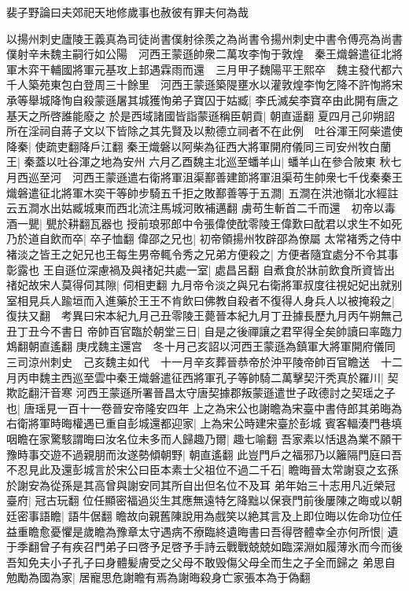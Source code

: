 裴子野論曰夫郊祀天地修歲事也赦彼有罪夫何為哉

以揚州刺史廬陵王義真為司徒尚書僕射徐羨之為尚書令揚州刺史中書令傅亮為尚書僕射辛未魏主嗣行如公陽　河西王蒙遜帥衆二萬攻李恂于敦煌　秦王熾磐遣征北將軍木弈干輔國將軍元基攻上邽遇霖雨而還　三月甲子魏陽平王熙卒　魏主發代都六千人築苑東包白登周三十餘里　河西王蒙遜築隄壅水以灌敦煌李恂乞降不許恂將宋承等舉城降恂自殺蒙遜屠其城獲恂弟子寶囚于姑臧|{
	李氏滅矣李寶卒由此開有唐之基天之所啓誰能廢之}
於是西域諸國皆詣蒙遜稱臣朝貢|{
	朝直遥翻}
夏四月己卯朔詔所在淫祠自蔣子文以下皆除之其先賢及以勲德立祠者不在此例　吐谷渾王阿柴遣使降秦|{
	使疏吏翻降戶江翻}
秦王熾磐以阿柴為征西大將軍開府儀同三司安州牧白蘭王|{
	秦蓋以吐谷渾之地為安州}
六月乙酉魏主北巡至蟠羊山|{
	蟠羊山在參合陂東}
秋七月西巡至河　河西王蒙遜遣右衛將軍沮渠鄯善建節將軍沮渠苟生帥衆七千伐秦秦王熾磐遣征北將軍木奕干等帥步騎五千拒之敗鄯善等于五澗|{
	五澗在洪池嶺北水經註云五澗水出姑臧城東而西北流注馬城河敗補邁翻}
虜苟生斬首二千而還　初帝以毒酒一甖|{
	甖於耕翻瓦器也}
授前琅邪郎中令張偉使酖零陵王偉歎曰酖君以求生不如死乃於道自飲而卒|{
	卒子恤翻}
偉邵之兄也|{
	初帝領揚州牧辟邵為僚屬}
太常褚秀之侍中褚淡之皆王之妃兄也王每生男帝輒令秀之兄弟方便殺之|{
	方便者隨宜處分不令其事彰露也}
王自遜位深慮禍及與禇妃共處一室|{
	處昌呂翻}
自煮食於牀前飲食所資皆出禇妃故宋人莫得伺其隙|{
	伺相吏翻}
九月帝令淡之與兄右衛將軍叔度往視妃妃出就别室相見兵人踰垣而入進藥於王王不肯飲曰佛教自殺者不復得人身兵人以被掩殺之|{
	復扶又翻　考異曰宋本紀九月己丑零陵王薨晉本紀九月丁丑據長歷九月丙午朔無己丑丁丑今不書日}
帝帥百官臨於朝堂三日|{
	自是之後禪讓之君罕得全矣帥讀曰率臨力鴆翻朝直遙翻}
庚戌魏主還宫　冬十月己亥詔以河西王蒙遜為鎮軍大將軍開府儀同三司涼州刺史　己亥魏主如代　十一月辛亥葬晉恭帝於沖平陵帝帥百官瞻送　十二月丙申魏主西巡至雲中秦王熾磐遣征西將軍孔子等帥騎二萬擊契汗秃真於羅川|{
	契欺訖翻汗音寒}
河西王蒙遜所署晉昌太守唐契據郡叛蒙遜遣世子政德討之契瑶之子也|{
	唐瑶見一百十一卷晉安帝隆安四年}
上之為宋公也謝瞻為宋臺中書侍郎其弟晦為右衛將軍時晦權遇已重自彭城還都迎家|{
	上為宋公時建宋臺於彭城}
賓客輻湊門巷填咽瞻在家驚駭謂晦曰汝名位未多而人歸趣乃爾|{
	趣七喻翻}
吾家素以恬退為業不願干豫時事交遊不過親朋而汝遂勢傾朝野|{
	朝直遙翻}
此豈門戶之福邪乃以籬隔門庭曰吾不忍見此及還彭城言於宋公曰臣本素士父祖位不過二千石|{
	瞻晦晉太常謝裒之玄孫於謝安為從孫是其高曾與謝安同其所自出但名位不及耳}
弟年始三十志用凡近榮冠臺府|{
	冠古玩翻}
位任顯密福過災生其應無遠特乞降黜以保衰門前後屢陳之晦或以朝廷密事語瞻|{
	語牛倨翻}
瞻故向親舊陳說用為戲笑以絶其言及上即位晦以佐命功位任益重瞻愈憂懼是歲瞻為豫章太守遇病不療臨終遺晦書曰吾得啓體幸全亦何所恨|{
	遺于季翻曾子有疾召門弟子曰啓予足啓予手詩云戰戰兢兢如臨深淵如履薄氷而今而後吾知免夫小子孔子曰身體髪膚受之父母不敢毁傷父母全而生之子全而歸之}
弟思自勉勵為國為家|{
	居寵思危謝瞻有焉為謝晦殺身亡家張本為于偽翻}


